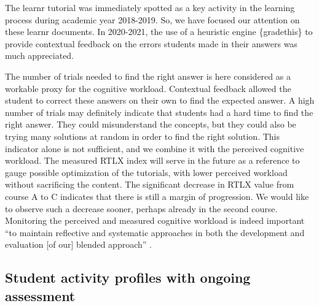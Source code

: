 \documentclass{aims}
\theoremstyle{definition}
\begin{document}
The learnr tutorial was immediately spotted as a key activity in the
learning process during academic year 2018-2019. So, we have focused our
attention on these learnr documents. In 2020-2021, the use of a
heuristic engine \{gradethis\} to provide contextual feedback on the
errors students made in their answers was much appreciated.

The number of trials needed to find the right answer is here considered
as a workable proxy for the cognitive workload. Contextual feedback
allowed the student to correct these answers on their own to find the
expected answer. A high number of trials may definitely indicate that
students had a hard time to find the right answer. They could
misunderstand the concepts, but they could also be trying many solutions
at random in order to find the right solution. This indicator alone is
not sufficient, and we combine it with the perceived cognitive workload.
The measured RTLX index will serve in the future as a reference to gauge
possible optimization of the tutorials, with lower perceived workload
without sacrificing the content. The significant decrease in RTLX value
from course A to C indicates that there is still a margin of
progression. We would like to observe such a decrease sooner, perhaps
already in the second course. Monitoring the perceived and measured
cognitive workload is indeed important ``to maintain reflective and
systematic approaches in both the development and evaluation {[}of
our{]} blended approach'' \cite{Spadafora2018}.

\hypertarget{student-activity-profiles-with-ongoing-assessment}{%
\subsection{Student activity profiles with ongoing
assessment}\label{student-activity-profiles-with-ongoing-assessment}}
\end{document}
